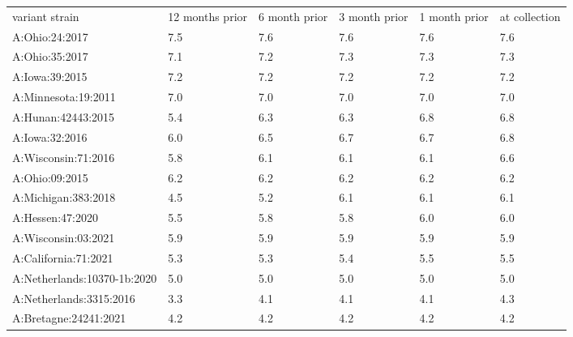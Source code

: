 \begin{tabular}{L{2.5in}|L{.6in}|L{.60in}|L{.6in}|C{.6in}|C{.6in}}\hline
 variant  strain & 12  months  prior & 6  month  prior & 3  month  prior & 1  month  prior & at  collection \\
A:Ohio:24:2017&7.5&7.6&7.6&7.6&7.6\\
A:Ohio:35:2017&7.1&7.2&7.3&7.3&7.3\\
A:Iowa:39:2015&7.2&7.2&7.2&7.2&7.2\\
A:Minnesota:19:2011&7.0&7.0&7.0&7.0&7.0\\
A:Hunan:42443:2015&5.4&6.3&6.3&6.8&6.8\\
A:Iowa:32:2016&6.0&6.5&6.7&6.7&6.8\\
A:Wisconsin:71:2016&5.8&6.1&6.1&6.1&6.6\\
A:Ohio:09:2015&6.2&6.2&6.2&6.2&6.2\\
A:Michigan:383:2018&4.5&5.2&6.1&6.1&6.1\\
A:Hessen:47:2020&5.5&5.8&5.8&6.0&6.0\\
A:Wisconsin:03:2021&5.9&5.9&5.9&5.9&5.9\\
A:California:71:2021&5.3&5.3&5.4&5.5&5.5\\
A:Netherlands:10370-1b:2020&5.0&5.0&5.0&5.0&5.0\\
A:Netherlands:3315:2016&3.3&4.1&4.1&4.1&4.3\\
A:Bretagne:24241:2021&4.2&4.2&4.2&4.2&4.2\\
\hline\end{tabular}
